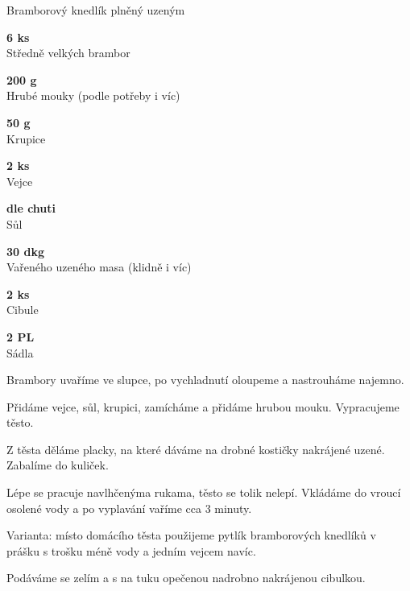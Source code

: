 \documentclass[11pt,a4paper]{article}
\begin{document}
\begin{recipe}[DarkOliveGreen]{Bramborový knedlík plněný uzeným}
    \begin{ingredients}
        \item \parbox[t]{\linewidth}{\raggedright \piece \textbf{6 ks}\\ Středně velkých brambor}
        \item \parbox[t]{\linewidth}{\raggedright \weight \textbf{200 g}\\ Hrubé mouky (podle potřeby i víc)}
        \item \parbox[t]{\linewidth}{\raggedright \weight \textbf{50 g}\\ Krupice}
        \item \parbox[t]{\linewidth}{\raggedright \piece \textbf{2 ks}\\ Vejce}
        \item \parbox[t]{\linewidth}{\raggedright \indefinite \textbf{dle chuti}\\ Sůl}
        \item \parbox[t]{\linewidth}{\raggedright \weight \textbf{30 dkg}\\ Vařeného uzeného masa (klidně i víc)}
        \item \parbox[t]{\linewidth}{\raggedright \piece \textbf{2 ks}\\ Cibule}
        \item \parbox[t]{\linewidth}{\raggedright \spoon \textbf{2 PL}\\ Sádla}
    \end{ingredients}
    \begin{steps}
        \item Brambory uvaříme ve slupce, po vychladnutí oloupeme a nastrouháme najemno.
        \item Přidáme vejce, sůl, krupici, zamícháme a přidáme hrubou mouku. Vypracujeme těsto.
        \item Z těsta děláme placky, na které dáváme na drobné kostičky nakrájené uzené. Zabalíme do kuliček.
        \item Lépe se pracuje navlhčenýma rukama, těsto se tolik nelepí. Vkládáme do vroucí osolené vody a po vyplavání vaříme cca 3 minuty.
        \item Varianta: místo domácího těsta použijeme pytlík bramborových knedlíků v prášku s trošku méně vody a jedním vejcem navíc.
        \item Podáváme se zelím a s na tuku opečenou nadrobno nakrájenou cibulkou.
    \end{steps}
\end{recipe}
\end{document}
